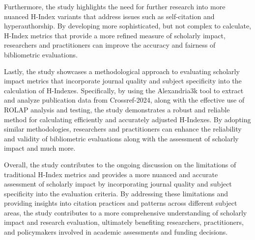 Furthermore, the study highlights the need for further research into more
nuanced H-Index variants that address issues such as self-citation and
hyperauthorship. By developing more sophisticated, but not complex to
calculate, H-Index metrics that provide a more refined measure of scholarly
impact, researchers and practitioners can improve the accuracy and fairness of
bibliometric evaluations.

Lastly, the study showcases a methodological approach to evaluating scholarly
impact metrics that incorporate journal quality and subject specificity into
the calculation of H-Indexes. Specifically, by using the Alexandria3k tool to
extract and analyze publication data from Crossref-2024, along with the
effective use of ROLAP analysis and testing, the study demonstrates a robust
and reliable method for calculating efficiently and accurately adjusted
H-Indexes. By adopting similar methodologies, researchers and practitioners can
enhance the reliability and validity of bibliometric evaluations along with the
assessment of scholarly impact and much more.

Overall, the study contributes to the ongoing discussion on the limitations of
traditional H-Index metrics and provides a more nuanced and accurate assessment
of scholarly impact by incorporating journal quality and subject specificity
into the evaluation criteria. By addressing these limitations and providing
insights into citation practices and patterns across different subject areas,
the study contributes to a more comprehensive understanding of scholarly impact
and research evaluation, ultimately benefiting researchers, practitioners, and
policymakers involved in academic assessments and funding decisions. %



